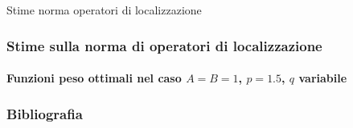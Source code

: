 \documentclass[aspectratio=141]{beamer}
\begin{document}
\begin{section}{Stime norma operatori di localizzazione}
	\begin{frame}
		\frametitle{Stime sulla norma di operatori di localizzazione}
		\framesubtitle{Funzioni peso ottimali nel caso $A=B=1$, $p=1.5$, $q$ variabile}
		\vspace{-1.1cm}
		\begin{center}
			\vspace{1cm}
		\end{center}
	\end{frame}
	
\end{section}

\begin{frame}[allowframebreaks]
	\frametitle{Bibliografia}
	{\tiny
	\nocite{*}
	\printbibliography}
\end{frame}

\end{document}
